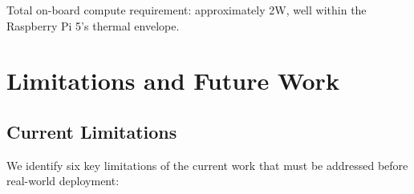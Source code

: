 \documentclass[12pt,a4paper]{article}
\begin{document}
Total on-board compute requirement: approximately 2W, well within the Raspberry Pi 5's thermal envelope.


\section{Limitations and Future Work}
\label{sec:limitations}

\subsection{Current Limitations}

We identify six key limitations of the current work that must be addressed before real-world deployment:
\end{document}
